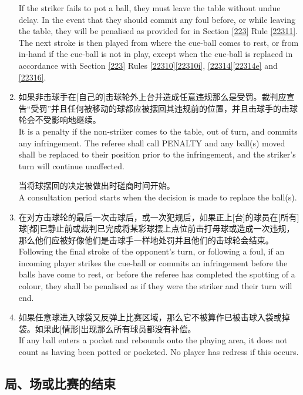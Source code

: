 \begin{enumerate}[label=(\alph*)]
    If the striker fails to pot a ball, they must leave the table without undue delay. In the event that they should commit any foul before, or while leaving the table, they will be penalised as provided for in Section \ref{223} Rule \ref{22311}. The next stroke is then played from where the cue-ball comes to rest, or from in-hand if the cue-ball is not in play, except when the cue-ball is replaced in accordance with Section \ref{223} Rules \ref{22310}\ref{22310i}, \ref{22314}\ref{22314e} and \ref{22316}.
    \item \label{2233k}如果非击球手在[自己的]击球轮外上台并造成任意违规那么是受罚。裁判应宣告``受罚''并且任何被移动的球都应被摆回其违规前的位置，并且击球手的击球轮会不受影响地继续。\\
    It is a penalty if the non-striker comes to the table, out of turn, and commits any infringement. The referee shall call PENALTY and any ball(s) moved shall be replaced to their position prior to the infringement, and the striker's turn will continue unaffected.

    当将球摆回的决定被做出时磋商时间开始。\\
    A consultation period starts when the decision is made to replace the ball(s).
    \item 在对方击球轮的最后一次击球后，或一次犯规后，如果正上[台]的球员在[所有]球[都]已静止前或裁判已完成将某彩球摆上点位前击打母球或造成一次违规，那么他们应被好像他们是击球手一样地处罚并且他们的击球轮会结束。\\
    Following the final stroke of the opponent's turn, or following a foul, if an incoming player strikes the cue-ball or commits an infringement before the balls have come to rest, or before the referee has completed the spotting of a colour, they shall be penalised as if they were the striker and their turn will end.
    \item 如果任意球进入球袋又反弹上比赛区域，那么它不被算作已被击球入袋或掉袋。如果此[情形]出现那么所有球员都没有补偿。\\
    If any ball enters a pocket and rebounds onto the playing area, it does not count as having been potted or pocketed. No player has redress if this occurs.
\end{enumerate}

\subsection{局、场或比赛的结束}\label{2234}

